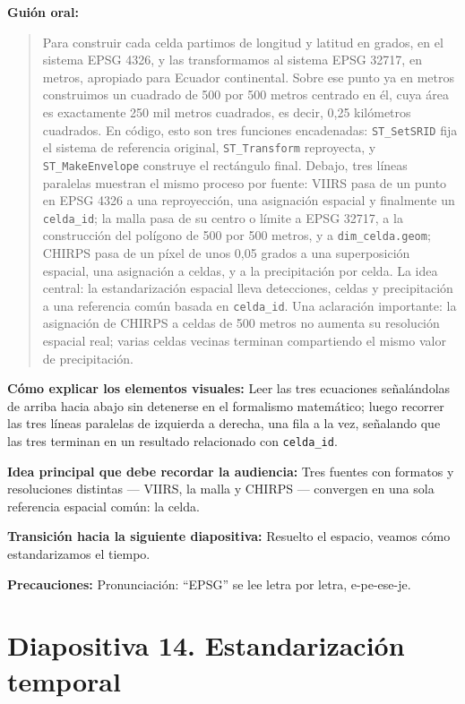 \documentclass[11pt,a4paper]{article}
\newcommand{\campo}[2]{\par\medskip\noindent\textbf{#1:} #2\par}
\newenvironment{guionoral}{%
  \medskip\noindent\textbf{Gui\'on oral:}\par\smallskip
  \begin{quote}\small
}{%
  \end{quote}
}
\newcommand{\separadordiapositiva}{\bigskip\noindent{\color{Tierra!60}\hrulefill}\bigskip}
\begin{document}
\begin{guionoral}
Para construir cada celda partimos de longitud y latitud en grados, en
el sistema EPSG 4326, y las transformamos al sistema EPSG 32717, en
metros, apropiado para Ecuador continental. Sobre ese punto ya en
metros construimos un cuadrado de 500 por 500 metros centrado en \'el,
cuya \'area es exactamente 250 mil metros cuadrados, es decir, 0,25
kil\'ometros cuadrados. En c\'odigo, esto son tres funciones
encadenadas: \texttt{ST\_SetSRID} fija el sistema de referencia
original, \texttt{ST\_Transform} reproyecta, y \texttt{ST\_MakeEnvelope}
construye el rect\'angulo final. Debajo, tres l\'ineas paralelas
muestran el mismo proceso por fuente: VIIRS pasa de un punto en EPSG
4326 a una reproyecci\'on, una asignaci\'on espacial y finalmente un
\texttt{celda\_id}; la malla pasa de su centro o l\'imite a EPSG 32717,
a la construcci\'on del pol\'igono de 500 por 500 metros, y a
\texttt{dim\_celda.geom}; CHIRPS pasa de un p\'ixel de unos 0,05
grados a una superposici\'on espacial, una asignaci\'on a celdas, y a
la precipitaci\'on por celda. La idea central: la estandarizaci\'on
espacial lleva detecciones, celdas y precipitaci\'on a una referencia
com\'un basada en \texttt{celda\_id}. Una aclaraci\'on importante: la
asignaci\'on de CHIRPS a celdas de 500 metros no aumenta su
resoluci\'on espacial real; varias celdas vecinas terminan compartiendo
el mismo valor de precipitaci\'on.
\end{guionoral}

\campo{C\'omo explicar los elementos visuales}{Leer las tres ecuaciones
se\~nal\'andolas de arriba hacia abajo sin detenerse en el formalismo
matem\'atico; luego recorrer las tres l\'ineas paralelas de izquierda a
derecha, una fila a la vez, se\~nalando que las tres terminan en un
resultado relacionado con \texttt{celda\_id}.}
\campo{Idea principal que debe recordar la audiencia}{Tres fuentes con
formatos y resoluciones distintas --- VIIRS, la malla y CHIRPS ---
convergen en una sola referencia espacial com\'un: la celda.}
\campo{Transici\'on hacia la siguiente diapositiva}{Resuelto el
espacio, veamos c\'omo estandarizamos el tiempo.}
\campo{Precauciones}{Pronunciaci\'on: ``EPSG'' se lee letra por letra,
e-pe-ese-je.}

\separadordiapositiva

\section*{Diapositiva 14. Estandarizaci\'on temporal}
\end{document}
